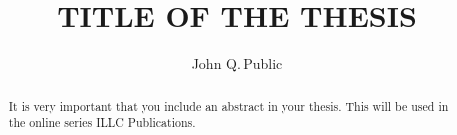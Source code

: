 \documentclass[titlepage]{report}
\begin{document}
\title{TITLE OF THE THESIS}
\author{John Q.\,Public}
\maketitle

\begin{abstract}
It is very important that you include an abstract in your thesis. This will be used in the online series ILLC Publications.
\end{abstract}
\end{document}
